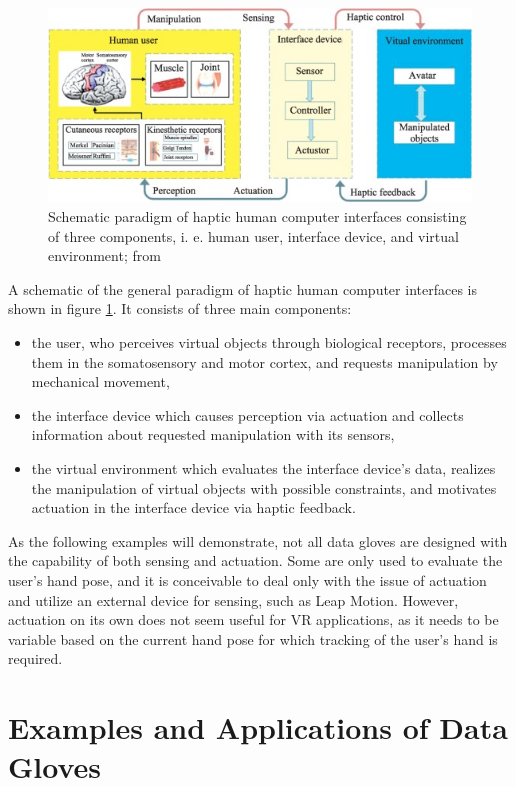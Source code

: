 \documentclass[hyperref, bachelorofscience]{cgvpub}
\begin{document}
\begin{figure}
	\centering
	\includegraphics[width=.8\linewidth]{../pics/wang01}
	\caption[Schematic paradigm of haptic human computer interfaces]{Schematic paradigm of haptic human computer interfaces consisting of three components, i. e. human user, interface device, and virtual environment; from \cite{wang19}}
	\label{fig:hci}
\end{figure}

A schematic of the general paradigm of haptic human computer interfaces is shown in figure \ref{fig:hci}. It consists of three main components:
\vspace{.3cm}
\begin{itemize}
	\item the user, who perceives virtual objects through biological receptors, processes them in the somatosensory and motor cortex, and requests manipulation by mechanical movement,
	\item the interface device which causes perception via actuation and collects information about requested manipulation with its sensors,
	\item the virtual environment which evaluates the interface device's data, realizes the manipulation of virtual objects with possible constraints, and motivates actuation in the interface device via haptic feedback.
\end{itemize}

As the following examples will demonstrate, not all data gloves are designed with the capability of both sensing and actuation. Some are only used to evaluate the user's hand pose, and it is conceivable to deal only with the issue of actuation and utilize an external device for sensing, such as Leap Motion. However, actuation on its own does not seem useful for VR applications, as it needs to be variable based on the current hand pose for which tracking of the user's hand is required.

\section{Examples and Applications of Data Gloves} \label{sec:ex}
\end{document}
